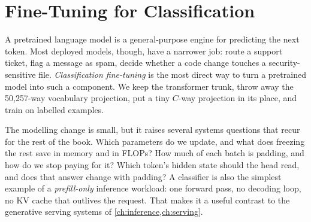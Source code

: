 \chapter{Fine-Tuning for Classification}\label{ch:classify}

A pretrained language model is a general-purpose engine for predicting the next token.
Most deployed models, though, have a narrower job: route a support ticket, flag a
message as spam, decide whether a code change touches a security-sensitive file.
\emph{Classification fine-tuning} is the most direct way to turn a pretrained model into
such a component. We keep the transformer trunk, throw away the 50{,}257-way vocabulary
projection, put a tiny $C$-way projection in its place, and train on labelled
examples.

The modelling change is small, but it raises several systems questions that recur for
the rest of the book. Which parameters do we update, and what does freezing the rest
save in memory and in FLOPs? How much of each batch is padding, and how do we stop
paying for it? Which token's hidden state should the head read, and does that answer
change with padding? A classifier is also the simplest example of a \emph{prefill-only}
inference workload: one forward pass, no decoding loop, no KV cache that outlives the
request. That makes it a useful contrast to the generative serving systems of
\cref{ch:inference,ch:serving}.

